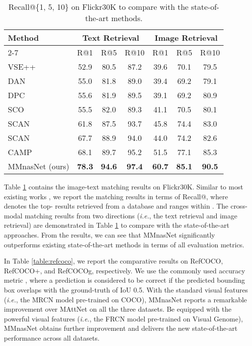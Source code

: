 \documentclass[sigconf]{acmart}
\begin{document}
\setcounter{table}{3}
\begin{table}
\centering
\small
\caption{Recall@\{1, 5, 10\} on Flickr30K to compare with the state-of-the-art methods.}
\label{table:flickr30k}
\begin{tabular}{l|ccc|ccc}
\toprule
\multirow{3}{*}{Method} & \multicolumn{3}{c|}{Text Retrieval} &\multicolumn{3}{c}{Image Retrieval} \\
\cmidrule{2-7}
 & R@1 &  R@5 &  R@10 & R@1 &  R@5 &  R@10 \\
\midrule
VSE++ \cite{faghri2017vse} & 52.9 &80.5 &87.2 & 39.6 &70.1 &79.5 \\
DAN \cite{nam2017dual} & 55.0 &81.8& 89.0 &39.4& 69.2& 79.1\\
DPC \cite{zheng2017dual} & 55.6 &81.9& 89.5 &39.1 &69.2 &80.9\\
SCO \cite{huang2018learning} &55.5 &82.0& 89.3 &41.1& 70.5& 80.1\\
SCAN \cite{lee2018stacked} & 61.8& 87.5& 93.7& 45.8 &74.4& 83.0\\
SCAN \cite{lee2018stacked} & 67.7 &88.9& 94.0& 44.0& 74.2 &82.6\\
CAMP \cite{wang2019camp} & 68.1 &89.7& 95.2& 51.5& 77.1& 85.3\\
\midrule
MMnasNet (ours)& \textbf{78.3} & \textbf{94.6} & \textbf{97.4} & \textbf{60.7} & \textbf{85.1} & \textbf{90.5} \\
\bottomrule
\end{tabular}
\end{table}

Table \ref{table:flickr30k} contains the image-text matching results on Flickr30K. Similar to most existing works \cite{lee2018stacked, wang2019camp}, we report the matching results in terms of Recall@, where  denotes the top- results retrieved from a database and ranges within .  The cross-modal matching results from two directions (\emph{i.e.}, the text retrieval and image retrieval) are demonstrated in Table \ref{table:flickr30k} to compare with the state-of-the-art approaches. From the results, we can see that MMnasNet significantly outperforms existing state-of-the-art methods in terms of all evaluation metrics.

In Table \ref{table:refcoco}, we report the comparative results on RefCOCO, RefCOCO+, and RefCOCOg, respectively. We use the commonly used accuracy metric \cite{yu2018mattnet}, where a prediction is considered to be correct if the predicted bounding box overlaps with the ground-truth of IoU 0.5. With the standard visual features (\emph{i.e.}, the MRCN model pre-trained on COCO), MMnasNet reports a remarkable improvement over MAttNet on all the three datasets. Be equipped with the powerful visual features (\emph{i.e.}, the FRCN model pre-trained on Visual Genome), MMnasNet obtains further improvement and delivers the new state-of-the-art performance across all datasets.
\end{document}
